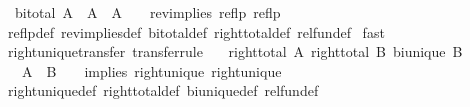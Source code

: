 \begin{isabellebody}
\ \ {\isachardoublequoteopen}bi{\isacharunderscore}{\kern0pt}total\ A\ {\isasymLongrightarrow}\ {\isacharparenleft}{\kern0pt}{\isacharparenleft}{\kern0pt}A\ {\isacharequal}{\kern0pt}{\isacharequal}{\kern0pt}{\isacharequal}{\kern0pt}{\isachargreater}{\kern0pt}\ A\ {\isacharequal}{\kern0pt}{\isacharequal}{\kern0pt}{\isacharequal}{\kern0pt}{\isachargreater}{\kern0pt}\ {\isacharparenleft}{\kern0pt}{\isacharequal}{\kern0pt}{\isacharparenright}{\kern0pt}{\isacharparenright}{\kern0pt}\ {\isacharequal}{\kern0pt}{\isacharequal}{\kern0pt}{\isacharequal}{\kern0pt}{\isachargreater}{\kern0pt}\ rev{\isacharunderscore}{\kern0pt}implies{\isacharparenright}{\kern0pt}\ reflp\ reflp{\isachardoublequoteclose}\isanewline
%
\isadelimproof
%
\endisadelimproof
%
\isatagproof
{}\isamarkupfalse%
\ reflp{\isacharunderscore}{\kern0pt}def\ rev{\isacharunderscore}{\kern0pt}implies{\isacharunderscore}{\kern0pt}def\ bi{\isacharunderscore}{\kern0pt}total{\isacharunderscore}{\kern0pt}def\ right{\isacharunderscore}{\kern0pt}total{\isacharunderscore}{\kern0pt}def\ rel{\isacharunderscore}{\kern0pt}fun{\isacharunderscore}{\kern0pt}def\isanewline
{}\isamarkupfalse%
\ fast{\isacharplus}{\kern0pt}%
\endisatagproof
{\isafoldproof}%
%
\isadelimproof
\isanewline
%
\endisadelimproof
\isanewline
{}\isamarkupfalse%
\ right{\isacharunderscore}{\kern0pt}unique{\isacharunderscore}{\kern0pt}transfer\ {\isacharbrackleft}{\kern0pt}transfer{\isacharunderscore}{\kern0pt}rule{\isacharbrackright}{\kern0pt}{\isacharcolon}{\kern0pt}\isanewline
\ \ {\isachardoublequoteopen}{\isasymlbrakk}\ right{\isacharunderscore}{\kern0pt}total\ A{\isacharsemicolon}{\kern0pt}\ right{\isacharunderscore}{\kern0pt}total\ B{\isacharsemicolon}{\kern0pt}\ bi{\isacharunderscore}{\kern0pt}unique\ B\ {\isasymrbrakk}\isanewline
\ \ {\isasymLongrightarrow}\ {\isacharparenleft}{\kern0pt}{\isacharparenleft}{\kern0pt}A\ {\isacharequal}{\kern0pt}{\isacharequal}{\kern0pt}{\isacharequal}{\kern0pt}{\isachargreater}{\kern0pt}\ B\ {\isacharequal}{\kern0pt}{\isacharequal}{\kern0pt}{\isacharequal}{\kern0pt}{\isachargreater}{\kern0pt}\ {\isacharparenleft}{\kern0pt}{\isacharequal}{\kern0pt}{\isacharparenright}{\kern0pt}{\isacharparenright}{\kern0pt}\ {\isacharequal}{\kern0pt}{\isacharequal}{\kern0pt}{\isacharequal}{\kern0pt}{\isachargreater}{\kern0pt}\ implies{\isacharparenright}{\kern0pt}\ right{\isacharunderscore}{\kern0pt}unique\ right{\isacharunderscore}{\kern0pt}unique{\isachardoublequoteclose}\isanewline
%
\isadelimproof
%
\endisadelimproof
%
\isatagproof
{}\isamarkupfalse%
\ right{\isacharunderscore}{\kern0pt}unique{\isacharunderscore}{\kern0pt}def\ right{\isacharunderscore}{\kern0pt}total{\isacharunderscore}{\kern0pt}def\ bi{\isacharunderscore}{\kern0pt}unique{\isacharunderscore}{\kern0pt}def\ rel{\isacharunderscore}{\kern0pt}fun{\isacharunderscore}{\kern0pt}def\isanewline

\end{isabellebody}
